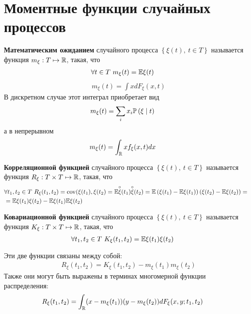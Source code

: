 \newpage
{}
\section{Моментные функции случайных процессов}
\begin{Def}
\textbf{Математическим ожиданием} случайного процесса $\left\{\xi(t), \ t \in T\right\}$ называется функция $m_\xi: T \mapsto \mathbb{R}$, такая, что
\begin{align*}
& \forall t \in T \ m_\xi(t) = \mathbb{E} \xi(t)
\end{align*}
\begin{align*}
& m_\xi(t) = \int xdF_\xi(x,t)
\end{align*}
В дискретном случае этот интеграл приобретает вид
\begin{align*}
& m_\xi(t) = \sum_i x_i \mathbb{P}\left(\xi \mid t\right)
\end{align*}
а в непрерывном
\begin{align*}
& m_\xi(t) = \int_{\mathbb{R}} xf_\xi(x,t) dx
\end{align*}
\end{Def}
\begin{Def}
\textbf{Корреляционной функцией} случайного процесса $\left\{\xi(t), \ t \in T\right\}$ называется функция $R_\xi: T\times T \mapsto \mathbb{R}$, такая, что
\begin{align*}
& \forall t_1, t_2 \in T \ R_\xi(t_1, t_2) = \operatorname{cov}(\xi(t_1), \xi(t_2) = \mathbb{E} \overset{\circ}{\xi}(t_1)\overset{\circ}{\xi}(t_2) = \mathbb{E} \left(\xi(t_1) - \mathbb{E} \xi(t_1)\right)\left(\xi(t_2) - \mathbb{E} \xi(t_2)\right) = \\
& = \mathbb{E} \xi(t_1)\xi(t_2) - \mathbb{E} \xi(t_1) \mathbb{E} \xi(t_2)
\end{align*}
\end{Def}
\begin{Def}
\textbf{Ковариационной функцией} случайного процесса $\left\{\xi(t), \ t \in T\right\}$ называется функция $K_\xi: T\times T \mapsto \mathbb{R}$, такая, что
\begin{align*}
& \forall t_1, t_2 \in T \ K_\xi(t_1, t_2) = \mathbb{E} \xi(t_1)\xi(t_2)
\end{align*}
\end{Def}
Эти две функции связаны между собой:
\begin{align*}
& R_\xi(t_1, t_2) = K_\xi(t_1, t_2) - m_\xi(t_1)m_\xi(t_2)
\end{align*}
Также они могут быть выражены в терминах многомерной функции распределения:
\begin{align*}
& R_\xi(t_1, t_2) = \int_{\mathbb{R}} (x-m_\xi(t_1))(y-m_\xi(t_2))dF_\xi(x,y;t_1,t_2)
\end{align*}
